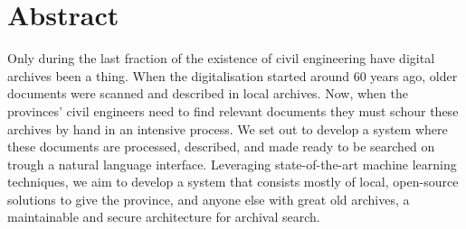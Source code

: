 \section{Abstract}
Only during the last fraction of the existence of civil engineering have digital archives been a thing. 
When the digitalisation started around 60 years ago, older documents were scanned and described in local archives.
Now, when the provinces' civil engineers need to find relevant documents they must schour these archives by hand in an intensive process.
We set out to develop a system where these documents are processed, described, and made ready to be searched on trough a natural language interface.
Leveraging state-of-the-art machine learning techniques, we aim to develop a system that consists mostly of local, open-source solutions to give the province, and anyone else with great old archives, a maintainable and secure architecture for archival search.   